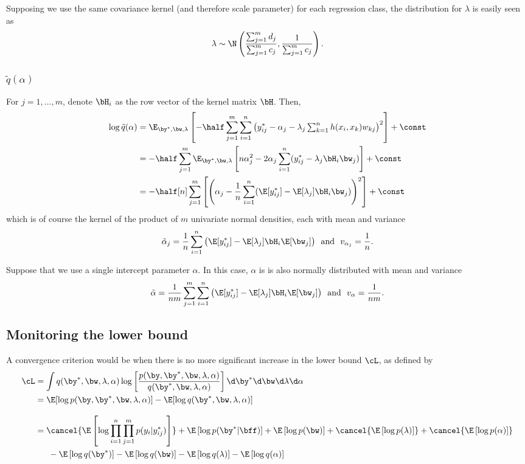 \documentclass[]{article}
\begin{document}
Supposing we use the same covariance kernel (and therefore scale parameter) for each regression class, the distribution for $\lambda$ is easily seen as
\[
  \lambda \sim \N \left( \frac{\sum_{j=1}^m d_j}{\sum_{j=1}^m c_j}, \frac{1}{\sum_{j=1}^m c_j} \right).
\]

\subsubsection{$\tilde q(\alpha)$}

For $j = 1,\dots,m$, denote $\bH_i$ as the row vector of the kernel matrix $\bH$. Then,
\begin{align*}
  \log \tilde q(\alpha) 
  &= \E_{\by^*, \bw, \lambda} \left[ 
  - \half \sum_{j=1}^m \sum_{i=1}^n \left( y_{ij}^* - \alpha_j 
  - \lambda_j \textstyle\sum_{k=1}^n h(x_i, x_k)w_{kj} \right)^2  
  \right] + \const \\  
  &= - \half \sum_{j=1}^m \E_{\by^*, \bw, \lambda} \left[ 
  n \alpha_j^2 - 2\alpha_j \sum_{i=1}^n(y_{ij}^* - \lambda_j \bH_i \bw_j) 
  \right] + \const \\  
  &= - \half[n] \sum_{j=1}^m \left[ \left( \alpha_j - \frac{1}{n} \sum_{i=1}^n(\E[y_{ij}^*] - \E[\lambda_j] \bH_i \bw_j) \right)^2 \right] + \const \\  
\end{align*}
which is of course the kernel of the product of $m$ univariate normal densities, each with mean and variance 
\[
   \tilde \alpha_j = \frac{1}{n} \sum_{i=1}^n \big(\E [y_{ij}^*] - \E[\lambda_j]\bH_i \E[\bw_j]  \big)
   \ \text{ and } \ 
   v_{\alpha_j} = \frac{1}{n}.
\]

Suppose that we use a single intercept parameter $\alpha$. In this case, $\alpha$ is is also normally distributed with mean and variance
\[
   \tilde \alpha = \frac{1}{nm} \sum_{j=1}^m \sum_{i=1}^n \big(\E [y_{ij}^*] - \E[\lambda_j]\bH_i \E[\bw_j]  \big)
   \ \text{ and } \ 
   v_{\alpha} = \frac{1}{nm}.
\]

\subsection{Monitoring the lower bound}

A convergence criterion would be when there is no more significant increase in the lower bound $\cL$, as defined by
\begin{align*}
  \cL &= \int q(\by^*,\bw,\lambda,\alpha) \log \left[ \frac{p(\by,\by^*,\bw,\lambda,\alpha)}{q(\by^*,\bw,\lambda,\alpha)} \right] \d\by^* \d\bw \d\lambda \d\alpha \\
  &= \E[\log p(\by,\by^*,\bw,\lambda,\alpha)] - \E[\log q(\by^*,\bw,\lambda,\alpha)] \\[8pt]
  &= \cancel{\E\left[\log \prod_{i=1}^n \prod_{j=1}^m p(y_{i}|y_{ij}^*)\right]}
  + \E\left[ \log p(\by^* | \bff) \right]
  + \E\left[ \log p(\bw) \right] 
  + \cancel{\E\left[ \log p(\lambda) \right]}
  + \cancel{\E\left[ \log p(\alpha) \right]}  \\
  &\phantom{==} - \E\left[ \log q(\by^*) \right]
  - \E\left[ \log q(\bw) \right]
  - \E\left[ \log q(\lambda) \right]
  - \E\left[ \log q(\alpha) \right]
\end{align*}
\end{document}
